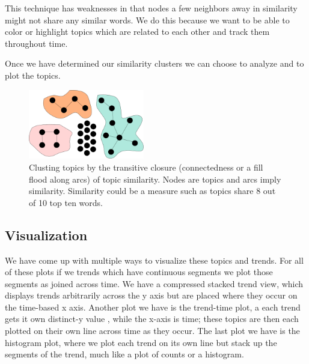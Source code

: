 \documentclass[times, 10pt,twocolumn]{article}
\begin{document}
This technique has weaknesses in that nodes a few neighbors away in
similarity might not share any similar words.  We do this because we
want to be able to color or highlight topics which are related to each
other and track them throughout time.

Once we have determined our similarity clusters we can choose to
analyze and to plot the topics.

\begin{figure}
  \centering
  \includegraphics[width=0.45\textwidth]{transitiveclosure}
  \caption{Clusting topics by the transitive closure (connectedness or
    a fill flood along arcs) of topic similarity. Nodes are topics and
    arcs imply similarity. Similarity could be a measure such as
    topics share 8 out of 10 top ten words.}
\label{fig:closure}
\end{figure}



\subsection{Visualization}

We have come up with multiple ways to visualize these topics and
trends.  For all of these plots if we trends which have continuous
segments we plot those segments as joined across time.  We have a
compressed stacked trend view, which displays trends arbitrarily
across the y axis but are placed where they occur on the time-based x
axis. Another plot we have is the trend-time plot, a each trend gets
it own distinct-y value , while the x-axis is time; these topics are
then each plotted on their own line across time as they occur. The
last plot we have is the histogram plot, where we plot each trend on
its own line but stack up the segments of the trend, much like a plot
of counts or a histogram.
\end{document}
